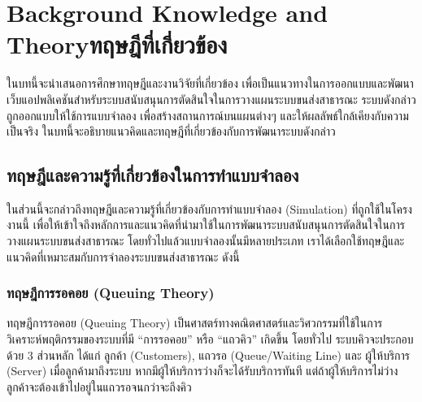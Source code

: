 \chapter{\ifenglish Background Knowledge and Theory\else ทฤษฎีที่เกี่ยวข้อง\fi}

\begin{mypara}
\indent ในบทนี้จะนำเสนอการศึกษาทฤษฎีและงานวิจัยที่เกี่ยวข้อง เพื่อเป็นแนวทางในการออกแบบและพัฒนาเว็บแอปพลิเคชันสำหรับระบบสนับสนุนการตัดสินใจในการวางแผนระบบขนส่งสาธารณะ 
    ระบบดังกล่าวถูกออกแบบให้ใช้การแบบจำลอง เพื่อสร้างสถานการณ์บนแผนต่างๆ 
    และให้ผลลัพธ์ใกล้เคียงกับความเป็นจริง ในบทนี้จะอธิบายแนวคิดและทฤษฎีที่เกี่ยวข้องกับการพัฒนาระบบดังกล่าว 
\end{mypara}

\section{ทฤษฎีและความรู้ที่เกี่ยวข้องในการทำแบบจำลอง}
    \begin{mypara}
        \indent ในส่วนนี้จะกล่าวถึงทฤษฎีและความรู้ที่เกี่ยวข้องกับการทำแบบจำลอง (Simulation) ที่ถูกใช้ในโครงงานนี้
        เพื่อให้เข้าใจถึงหลักการและแนวคิดที่นำมาใช้ในการพัฒนาระบบสนับสนุนการตัดสินใจในการวางแผนระบบขนส่งสาธารณะ
        โดยทั่วไปแล้วแบบจำลองนั้นมีหลายประเภท เราได้เลือกใช้ทฤษฎีและแนวคิดที่เหมาะสมกับการจำลองระบบขนส่งสาธารณะ ดังนี้
    \end{mypara}

\subsection{ทฤษฎีการรอคอย (Queuing Theory)}
\begin{mypara}
    \indent ทฤษฎีการรอคอย (Queuing Theory) เป็นศาสตร์ทางคณิตศาสตร์และวิศวกรรมที่ใช้ในการวิเคราะห์พฤติกรรมของระบบที่มี 
    “การรอคอย” หรือ “แถวคิว” เกิดขึ้น โดยทั่วไป ระบบคิวจะประกอบด้วย 3 ส่วนหลัก ได้แก่ ลูกค้า (Customers), 
    แถวรอ (Queue/Waiting Line) และ ผู้ให้บริการ (Server) เมื่อลูกค้ามาถึงระบบ หากมีผู้ให้บริการว่างก็จะได้รับบริการทันที 
    แต่ถ้าผู้ให้บริการไม่ว่าง ลูกค้าจะต้องเข้าไปอยู่ในแถวรอจนกว่าจะถึงคิว
\end{mypara}

